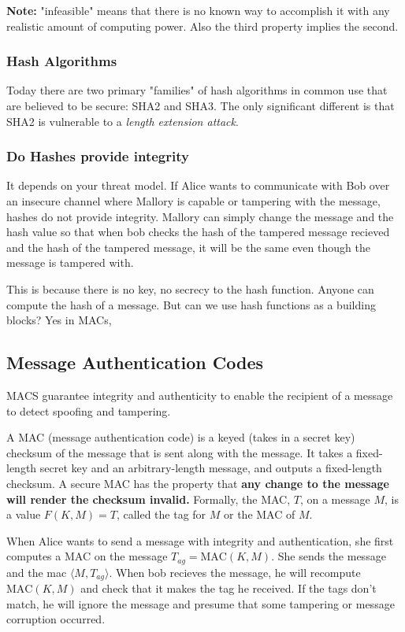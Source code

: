 \documentclass{article}
\begin{document}
\textbf{Note:} "infeasible" means that there is no known way to accomplish it with any realistic amount of computing power. Also the third property implies the second.

\subsubsection{Hash Algorithms}
Today there are two primary "families" of hash algorithms in common use that are believed to be secure: SHA2 and SHA3. The only significant different is that SHA2 is vulnerable to a \emph{length extension attack}.

\subsubsection{Do Hashes provide integrity}
It depends on your threat model. If Alice wants to communicate with Bob over an insecure channel where Mallory is capable or tampering with the message, hashes do not provide integrity. Mallory can simply change the message and the hash value so that when bob checks the hash of the tampered message recieved and the hash of the tampered message, it will be the same even though the message is tampered with.

This is because there is no key, no secrecy to the hash function. Anyone can compute the hash of a message. But can we use hash functions as a building blocks? Yes in MACs,
\subsection{Message Authentication Codes}
MACS guarantee integrity and authenticity to enable the recipient of a message to detect spoofing and tampering.
\begin{definition}
    A MAC (message authentication code) is a keyed (takes in a secret key) checksum of the message that is sent along with the message. It takes a fixed-length secret key and an arbitrary-length message, and outputs a fixed-length checksum. A secure MAC has the property that \textbf{any change to the message will render the checksum invalid.} Formally, the MAC, $T$, on a message $M$, is a value $F(K,M) = T$, called the tag for $M$ or the MAC of $M$.
\end{definition}

When Alice wants to send a message with integrity and authentication, she first computes a MAC on the message $T_{ag} = \text{MAC}(K, M)$. She sends the message and the mac $\langle M, T_{ag}\rangle$. When bob recieves the message, he will recompute $\text{MAC}(K, M)$ and check that it makes the tag he received. If the tags don't match, he will ignore the message and presume that some tampering or message corruption occurred.
\end{document}
